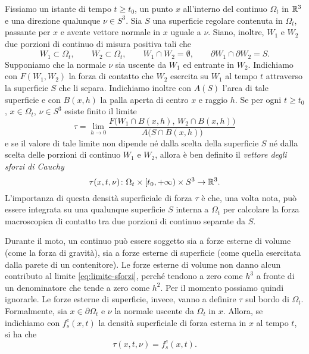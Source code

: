 Fissiamo un istante di tempo $t \geq t_0$, un punto $x$ all'interno
del continuo $\Omega_t$ in $\mathbb{R}^3$ e una direzione qualunque $\nu \in S^3$.
Sia $S$ una superficie regolare contenuta in $\Omega_t$,
passante per $x$ e avente vettore normale in $x$ uguale a $\nu$.
Siano, inoltre, $W_1$ e $W_2$ due porzioni di continuo di misura
positiva tali che
\[
W_1 \subset \Omega_t,
\qquad W_2 \subset \Omega_t,
\qquad W_1 \cap W_2 = \emptyset,
\qquad \partial W_1 \cap \partial W_2 = S.
\]
Supponiamo che la normale $\nu$ sia uscente da $W_1$ ed entrante in $W_2$.
Indichiamo con $F(W_1,W_2)$ la forza di contatto che $W_2$ esercita
su $W_1$ al tempo $t$ attraverso la superficie $S$ che li separa.
Indichiamo inoltre con $A(S)$ l'area di tale superficie
e con $B(x,h)$ la palla aperta di centro $x$ e raggio $h$.
Se per ogni $t \geq t_0$, $x \in \Omega_t$, $\nu \in S^3$
esiste finito il limite
\begin{equation} \label{eq:limite-sforzi}
\tau =
\lim_{h \to 0}
	\frac{F\bigl(W_1 \cap B(x,h), \, W_2 \cap B(x,h)\bigr)}
	     {A\bigl(S \cap B(x,h)\bigr)}
\end{equation}
e se il valore di tale limite non dipende né dalla scelta della superficie $S$
né dalla scelta delle porzioni di continuo $W_1$ e $W_2$, allora
è ben definito il \emph{vettore degli sforzi di Cauchy}
\[
\tau(x,t,\nu) \colon \Omega_t \times [t_0,+\infty) \times S^3 \to \mathbb{R}^3.
\]
L'importanza di questa densità superficiale di forza $\tau$
è che, una volta nota, può essere integrata su una qualunque
superficie $S$ interna a $\Omega_t$ per calcolare la forza macroscopica 
di contatto tra due porzioni di continuo separate da $S$.

Durante il moto, un continuo può essere soggetto sia a forze esterne
di volume (come la forza di gravità), sia a forze esterne
di superficie (come quella esercitata dalla parete di un contenitore).
Le forze esterne di volume non danno alcun contributo al limite
\eqref{eq:limite-sforzi}, perché tendono a zero come $h^3$ a fronte
di un denominatore che tende a zero come $h^2$.
Per il momento possiamo quindi ignorarle.
Le forze esterne di superficie, invece, vanno a definire $\tau$
sul bordo di $\Omega_t$. Formalmente, sia $x \in \partial \Omega_t$
e $\nu$ la normale uscente da $\Omega_t$ in $x$. Allora, se indichiamo
con $f_s^e(x,t)$ la densità superficiale di forza esterna
in $x$ al tempo $t$, si ha che
\begin{equation} \label{eq:sforzo-sul-bordo}
\tau(x,t,\nu) = f_s^e(x,t).
\end{equation}

